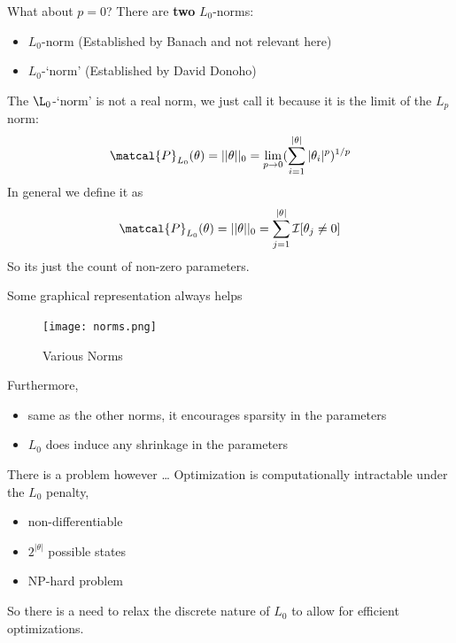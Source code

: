 \documentclass{beamer}
\begin{document}
\begin{frame}[t]{What about $p=0$?}
  There are \textbf{two} $L_0$-norms:
  \begin{itemize}
    \item $L_0$-norm (Established by Banach and not relevant here)
    \item $L_0$-`norm' (Established by David Donoho)
  \end{itemize}
  The $\L_0$-`norm' is not a real norm, we just call it because it is the limit of the $L_p$ norm:
  \begin{equation}
    \matcal{P}_{L_0}(\theta) = ||\theta||_0 = \lim_{p \rightarrow 0} (\sum^{|\theta|}_{i=1} |\theta_i|^{p})^{1/p}
  \end{equation}
  In general we define it as 
  \begin{equation}
    \matcal{P}_{L_0}(\theta) = ||\theta||_0 = \sum^{|\theta|}_{j=1} \mathcal{I}[\theta_j \neq 0]
  \end{equation}
  So its just the count of non-zero parameters.
\end{frame}

\begin{frame}[t]{Some graphical representation always helps}
  \begin{figure}[htpb]
    \centering
    \texttt{[image: norms.png]}
    \caption{Various Norms}\label{fig:norms}
  \end{figure} 
  Furthermore, 
  \begin{itemize}
    \item same as the other norms, it encourages sparsity in the parameters
    \item $L_0$ does induce any shrinkage in the parameters
  \end{itemize}
\end{frame}

\begin{frame}[t]{There is a problem however \ldots}
  Optimization is computationally intractable under the $L_0$ penalty,
  \begin{itemize}
    \item non-differentiable %
    \item $2^{|\theta|}$ possible states
    \item NP-hard problem
  \end{itemize}
  So there is a need to relax the discrete nature of $L_0$ to allow for efficient optimizations.
\end{frame}
\end{document}
